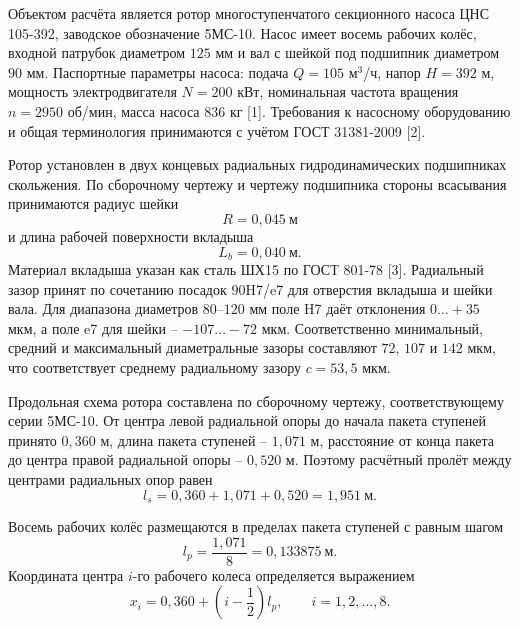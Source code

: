 \documentclass[14pt,a4paper]{extarticle}
\numberwithin{equation}{section}
\numberwithin{figure}{section}
\numberwithin{table}{section}
\begin{document}
Объектом расчёта является ротор многоступенчатого секционного насоса ЦНС 105-392, заводское обозначение 5МС-10. Насос имеет восемь рабочих колёс, входной патрубок диаметром $125$ мм и вал с шейкой под подшипник диаметром $90$ мм. Паспортные параметры насоса: подача $Q=105$ м$^3$/ч, напор $H=392$ м, мощность электродвигателя $N=200$ кВт, номинальная частота вращения $n=2950$ об/мин, масса насоса $836$ кг [1]. Требования к насосному оборудованию и общая терминология принимаются с учётом ГОСТ 31381-2009 [2].

Ротор установлен в двух концевых радиальных гидродинамических подшипниках скольжения. По сборочному чертежу и чертежу подшипника стороны всасывания принимаются радиус шейки
\begin{equation}
    R=0{,}045~\text{м}
\end{equation}
и длина рабочей поверхности вкладыша
\begin{equation}
    L_b=0{,}040~\text{м}.
\end{equation}
Материал вкладыша указан как сталь ШХ15 по ГОСТ 801-78 [3]. Радиальный зазор принят по сочетанию посадок $90$H7/e7 для отверстия вкладыша и шейки вала. Для диапазона диаметров $80$--$120$ мм поле H7 даёт отклонения $0\ldots+35$ мкм, а поле e7 для шейки -- $-107\ldots-72$ мкм. Соответственно минимальный, средний и максимальный диаметральные зазоры составляют $72$, $107$ и $142$ мкм, что соответствует среднему радиальному зазору $c=53{,}5$ мкм.

Продольная схема ротора составлена по сборочному чертежу, соответствующему серии 5МС-10. От центра левой радиальной опоры до начала пакета ступеней принято $0{,}360$ м, длина пакета ступеней -- $1{,}071$ м, расстояние от конца пакета до центра правой радиальной опоры -- $0{,}520$ м. Поэтому расчётный пролёт между центрами радиальных опор равен
\begin{equation}
    l_s=0{,}360+1{,}071+0{,}520=1{,}951~\text{м}.
    \label{eq:span_cns105}
\end{equation}

Восемь рабочих колёс размещаются в пределах пакета ступеней с равным шагом
\begin{equation}
    l_p=\frac{1{,}071}{8}=0{,}133875~\text{м}.
\end{equation}
Координата центра $i$-го рабочего колеса определяется выражением
\begin{equation}
    x_i=0{,}360+\left(i-\frac{1}{2}\right)l_p,\qquad i=1,2,\ldots,8.
    \label{eq:stage_coordinates_cns105}
\end{equation}
\end{document}
